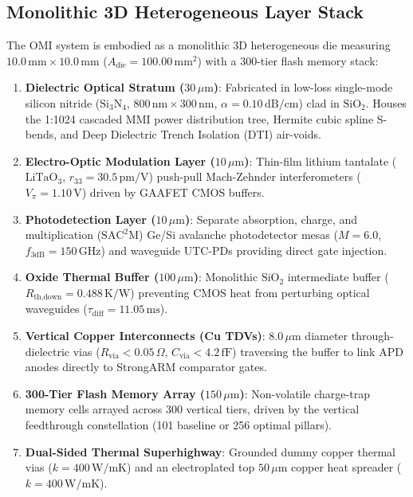\documentclass[journal]{IEEEtran}
\begin{document}
\subsection{Monolithic 3D Heterogeneous Layer Stack}
The OMI system is embodied as a monolithic 3D heterogeneous die measuring $10.0\,\text{mm} \times 10.0\,\text{mm}$ ($A_{\text{die}} = 100.00\,\text{mm}^2$) with a 300-tier flash memory stack:
\begin{enumerate}
    \item \textbf{Dielectric Optical Stratum ($30\,\mu\text{m}$)}: Fabricated in low-loss single-mode silicon nitride ($\text{Si}_3\text{N}_4$, $800\,\text{nm} \times 300\,\text{nm}$, $\alpha = 0.10\,\text{dB/cm}$) clad in $\text{SiO}_2$. Houses the 1:1024 cascaded MMI power distribution tree, Hermite cubic spline S-bends, and Deep Dielectric Trench Isolation (DTI) air-voids.
    \item \textbf{Electro-Optic Modulation Layer ($10\,\mu\text{m}$)}: Thin-film lithium tantalate ($\text{LiTaO}_3$, $r_{33} = 30.5\,\text{pm/V}$) push-pull Mach-Zehnder interferometers ($V_\pi = 1.10\,\text{V}$) driven by GAAFET CMOS buffers.
    \item \textbf{Photodetection Layer ($10\,\mu\text{m}$)}: Separate absorption, charge, and multiplication ($\text{SAC}^2\text{M}$) Ge/Si avalanche photodetector mesas ($M = 6.0$, $f_{3\text{dB}} = 150\,\text{GHz}$) and waveguide UTC-PDs providing direct gate injection.
    \item \textbf{Oxide Thermal Buffer ($100\,\mu\text{m}$)}: Monolithic $\text{SiO}_2$ intermediate buffer ($R_{\text{th,down}} = 0.488\,\text{K/W}$) preventing CMOS heat from perturbing optical waveguides ($\tau_{\text{diff}} = 11.05\,\text{ms}$).
    \item \textbf{Vertical Copper Interconnects (Cu TDVs)}: $8.0\,\mu\text{m}$ diameter through-dielectric vias ($R_{\text{via}} < 0.05\,\Omega$, $C_{\text{via}} < 4.2\,\text{fF}$) traversing the buffer to link APD anodes directly to StrongARM comparator gates.
    \item \textbf{300-Tier Flash Memory Array ($150\,\mu\text{m}$)}: Non-volatile charge-trap memory cells arrayed across 300 vertical tiers, driven by the vertical feedthrough constellation (101 baseline or 256 optimal pillars).
    \item \textbf{Dual-Sided Thermal Superhighway}: Grounded dummy copper thermal vias ($k = 400\,\text{W/mK}$) and an electroplated top $50\,\mu\text{m}$ copper heat spreader ($k = 400\,\text{W/mK}$).
\end{enumerate}
\end{document}
